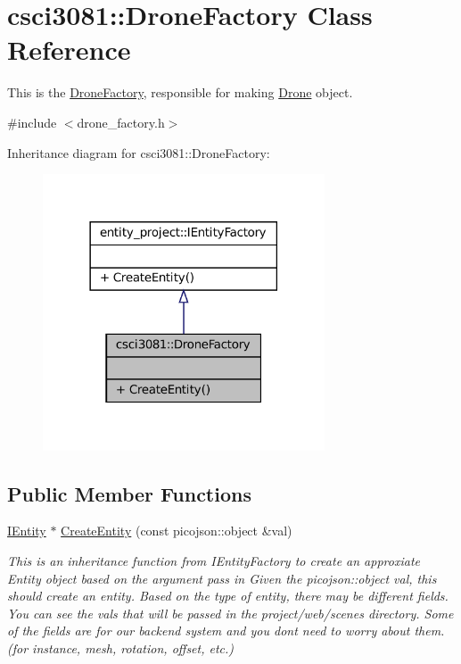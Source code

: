 \hypertarget{classcsci3081_1_1DroneFactory}{}\section{csci3081\+:\+:Drone\+Factory Class Reference}
\label{classcsci3081_1_1DroneFactory}


This is the \hyperlink{classcsci3081_1_1DroneFactory}{Drone\+Factory}, responsible for making \hyperlink{classcsci3081_1_1Drone}{Drone} object.  




{\ttfamily \#include $<$drone\+\_\+factory.\+h$>$}



Inheritance diagram for csci3081\+:\+:Drone\+Factory\+:
\nopagebreak
\begin{figure}[H]
\begin{center}
\leavevmode
\includegraphics[width=237pt]{classcsci3081_1_1DroneFactory__inherit__graph}
\end{center}
\end{figure}
\subsection*{Public Member Functions}
\begin{DoxyCompactItemize}
\item 
\hyperlink{classentity__project_1_1IEntity}{I\+Entity} $\ast$ \hyperlink{classcsci3081_1_1DroneFactory_a84b3bc534c666c4485383bce502056b8}{Create\+Entity} (const picojson\+::object \&val)
\begin{DoxyCompactList}\small\item\em This is an inheritance function from I\+Entity\+Factory to create an approxiate Entity object based on the argument pass in Given the picojson\+::object val, this should create an entity. Based on the type of entity, there may be different fields. You can see the vals that will be passed in the project/web/scenes directory. Some of the fields are for our backend system and you don\textquotesingle{}t need to worry about them. (for instance, mesh, rotation, offset, etc.) \end{DoxyCompactList}\end{DoxyCompactItemize}



